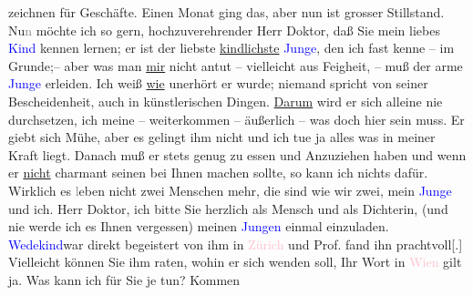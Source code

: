                zeichnen für Geschäfte. Einen Monat ging das, aber nun ist grosser Stillstand.
                  Nu\textcolor{gray}{n} möchte ich so gern, hochzuverehrender Herr Doktor, daß Sie
               mein liebes \textcolor{blue}{Kind}{} kennen
               lernen; er ist der liebste \uline{kindlichste}{ }\textcolor{blue}{Junge}{}, den ich fast kenne –
               im Grunde;– aber was man \uline{mir} nicht antut – vielleicht
               aus Feigheit, – muß der arme \textcolor{blue}{Junge}{} erleiden. Ich weiß \uline{wie} unerhört er
                  \label{K_L02653-3v}\label{K_L02653-3h}
               wurde; niemand spricht von seiner Bescheidenheit, auch in künstlerischen Dingen. {\pb}\uline{Darum} wird er sich alleine nie durchsetzen, ich meine
               – weiterkommen – äußerlich – was doch \introOben{}hier\introOben{} sein muss. Er
               giebt sich \strikeout{\textcolor{gray}{so}} Mühe, aber es gelingt ihm nicht und ich tue ja alles was in meiner Kraft
               liegt. Danach muß er stets genug zu essen und Anzuziehen haben und wenn er \uline{nicht} charmant seinen \label{K_L02653-5v}\label{K_L02653-5h} bei Ihnen machen sollte, so kann ich nichts dafür. Wirklich es
                  \textcolor{gray}{l}eben nicht zwei Menschen mehr, die \label{K_L02653-6v}\label{K_L02653-6h} sind
               wie wir zwei, mein \textcolor{blue}{Junge}{} und
               ich. Herr Doktor, ich bitte Sie herzlich als Mensch und als Dichterin, \introOben{}(\introOben{}und nie werde ich es Ihnen vergessen) meinen \textcolor{blue}{Jungen}{} einmal einzuladen. \textcolor{blue}{Wedekind}{}\ledrightnote{\textcolor{blue}{Frank Wedekind}}{ }\introOben{}war direkt begeistert von ihm in \textcolor{pink}{Zürich}{}\ledrightnote{\textcolor{pink}{Zürich}}\introOben{} und Prof. \label{K_L02653-7v}\label{K_L02653-7h} fand ihn prachtvoll{[}.{]}{ }{\pb}Vielleicht können Sie ihm raten, wohin er sich wenden soll, Ihr Wort in \textcolor{pink}{Wien}{}\ledrightnote{\textcolor{pink}{Wien}} gilt ja. Was kann ich für Sie je tun? Kommen
